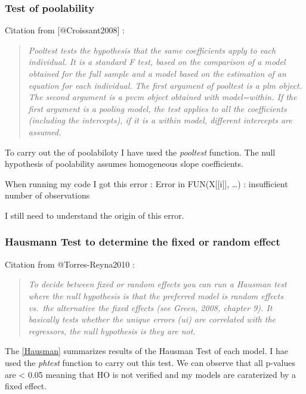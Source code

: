 \documentclass[]{article}
\begin{document}
\newpage

\subsubsection{Test of poolability}\label{test-of-poolability}

Citation from {[}@Croissant2008{]} :

\begin{quote}
\emph{Pooltest tests the hypothesis that the same coefficients apply to
each individual. It is a standard F test, based on the comparison of a
model obtained for the full sample and a model based on the estimation
of an equation for each individual. The first argument of pooltest is a
plm object. The second argument is a pvcm object obtained with
model=within. If the first argument is a pooling model, the test applies
to all the coefficients (including the intercepts), if it is a within
model, different intercepts are assumed.}
\end{quote}

To carry out the of poolabiloty I have used the \emph{pooltest}
function. The null hypothesis of poolability assumes homogeneous slope
coefficients.

When running my code I got this error : Error in FUN(X{[}{[}i{]}{]},
\ldots{}) : insufficient number of observations

I still need to understand the origin of this error.

\subsubsection{Hausmann Test to determine the fixed or random
effect}\label{hausmann-test-to-determine-the-fixed-or-random-effect}

Citation from @Torres-Reyna2010 :

\begin{quote}
\emph{To decide between fixed or random effects you can run a Hausman
test where the null hypothesis is that the preferred model is random
effects vs.~the alternative the fixed effects (see Green, 2008, chapter
9). It basically tests whether the unique errors (ui) are correlated
with the regressors, the null hypothesis is they are not.}
\end{quote}

The \autoref{Hausman} summarizes results of the Hausman Test of each
model. I hae used the \emph{phtest} function to carry out this test. We
can observe that all p-values are \textless{} 0.05 meaning that HO is
not verified and my models are caraterized by a fixed effect.
\end{document}
